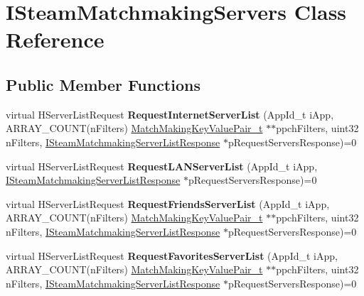 \hypertarget{classISteamMatchmakingServers}{}\section{I\+Steam\+Matchmaking\+Servers Class Reference}
\label{classISteamMatchmakingServers}
\subsection*{Public Member Functions}
\begin{DoxyCompactItemize}
\item 
\hypertarget{classISteamMatchmakingServers_a5e8c6625f6acec2bed9786e8c7e66c87}{}virtual H\+Server\+List\+Request {\bfseries Request\+Internet\+Server\+List} (App\+Id\+\_\+t i\+App, A\+R\+R\+A\+Y\+\_\+\+C\+O\+U\+N\+T(n\+Filters) \hyperlink{structMatchMakingKeyValuePair__t}{Match\+Making\+Key\+Value\+Pair\+\_\+t} $\ast$$\ast$ppch\+Filters, uint32 n\+Filters, \hyperlink{classISteamMatchmakingServerListResponse}{I\+Steam\+Matchmaking\+Server\+List\+Response} $\ast$p\+Request\+Servers\+Response)=0\label{classISteamMatchmakingServers_a5e8c6625f6acec2bed9786e8c7e66c87}

\item 
\hypertarget{classISteamMatchmakingServers_a144360d95efe342d49c4686e8b886c0c}{}virtual H\+Server\+List\+Request {\bfseries Request\+L\+A\+N\+Server\+List} (App\+Id\+\_\+t i\+App, \hyperlink{classISteamMatchmakingServerListResponse}{I\+Steam\+Matchmaking\+Server\+List\+Response} $\ast$p\+Request\+Servers\+Response)=0\label{classISteamMatchmakingServers_a144360d95efe342d49c4686e8b886c0c}

\item 
\hypertarget{classISteamMatchmakingServers_a5293c56e50049e1d915103806f479167}{}virtual H\+Server\+List\+Request {\bfseries Request\+Friends\+Server\+List} (App\+Id\+\_\+t i\+App, A\+R\+R\+A\+Y\+\_\+\+C\+O\+U\+N\+T(n\+Filters) \hyperlink{structMatchMakingKeyValuePair__t}{Match\+Making\+Key\+Value\+Pair\+\_\+t} $\ast$$\ast$ppch\+Filters, uint32 n\+Filters, \hyperlink{classISteamMatchmakingServerListResponse}{I\+Steam\+Matchmaking\+Server\+List\+Response} $\ast$p\+Request\+Servers\+Response)=0\label{classISteamMatchmakingServers_a5293c56e50049e1d915103806f479167}

\item 
\hypertarget{classISteamMatchmakingServers_a4dafd8c87dc378a8510a348de54efd65}{}virtual H\+Server\+List\+Request {\bfseries Request\+Favorites\+Server\+List} (App\+Id\+\_\+t i\+App, A\+R\+R\+A\+Y\+\_\+\+C\+O\+U\+N\+T(n\+Filters) \hyperlink{structMatchMakingKeyValuePair__t}{Match\+Making\+Key\+Value\+Pair\+\_\+t} $\ast$$\ast$ppch\+Filters, uint32 n\+Filters, \hyperlink{classISteamMatchmakingServerListResponse}{I\+Steam\+Matchmaking\+Server\+List\+Response} $\ast$p\+Request\+Servers\+Response)=0\label{classISteamMatchmakingServers_a4dafd8c87dc378a8510a348de54efd65}


\end{DoxyCompactItemize}
